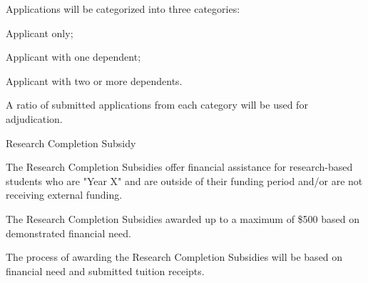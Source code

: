 \begin{longenum}[ label*=\thesubsection.\arabic*., align=left]
\begin{longenum}[ label*=\arabic*., align=left]
		\item Applications will be categorized into three categories:
			\begin{longenum}[ label*=\arabic*., align=left]
			\item Applicant only;			
			\item Applicant with one dependent;
			\item Applicant with two or more dependents.
			\end{longenum}		
		\item A ratio of submitted applications from each category will be used for adjudication.					
		\end{longenum}
	\item Research Completion Subsidy
		\begin{longenum}[ label*=\arabic*., align=left]	
		\item The Research Completion Subsidies offer financial assistance for research-based students who are "Year X" and are outside of their funding period and/or are not receiving external funding.
		\item The Research Completion Subsidies awarded up to a maximum of \$500 based on demonstrated financial need.
		\item The process of awarding the Research Completion Subsidies will be based on financial need and submitted tuition receipts.
		\end{longenum}		
\end{longenum} 